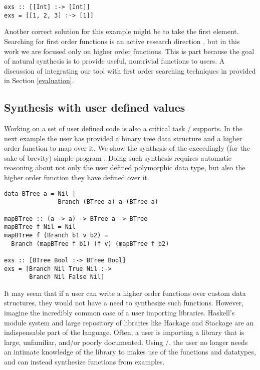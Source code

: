\begin{lstlisting}
exs :: [[Int] :-> [Int]]
exs = [[1, 2, 3] :-> [1]]
\end{lstlisting}

Another correct solution for this example might be  to take the first element. Searching for first order functions is an active research direction \cite{DBLP:conf/aaip/Katayama09, flashFillPOPL}, but in this work we are focused only on higher order functions. This is part because the goal of natural synthesis is to provide useful, nontrivial functions to users. A discussion of integrating our tool with first order searching techniques in provided in Section \ref{evaluation}.

\subsection{Synthesis with user defined values}

Working on a set of user defined code is also a critical task \ourTool/ supports. In the next example the user has provided a binary tree data structure and a higher order function to map over it. We show the synthesis of the exceedingly (for the sake of brevity) simple program . Doing such synthesis requires automatic reasoning about not only the user defined polymorphic data type, but also the higher order function they have defined over it.

\begin{lstlisting}
data BTree a = Nil |
               Branch (BTree a) a (BTree a)

mapBTree :: (a -> a) -> BTree a -> BTree 
mapBTree f Nil = Nil
mapBTree f (Branch b1 v b2) = 
  Branch (mapBTree f b1) (f v) (mapBTree f b2)

exs :: [BTree Bool :-> BTree Bool]
exs = [Branch Nil True Nil :->
       Branch Nil False Nil]
\end{lstlisting}

It may seem that if a user can write a higher order functions over custom data structures, they would not have a need to synthesize such functions.
However, imagine the incredibly common case of a user importing libraries.
Haskell's module system and large repository of libraries like Hackage and Stackage are an indispensable part of the language\cite{hackage,stackage}.
Often, a user is importing a library that is large, unfamiliar, and/or poorly documented.
Using \ourTool/, the user no longer needs an intimate knowledge of the library to makes use of the functions and datatypes, and can instead synthesize functions from examples.


